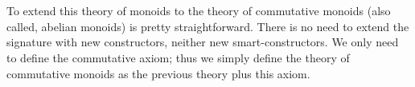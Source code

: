 \begin{code}
\>[4]\AgdaSpace{}%
\AgdaSymbol{=}\AgdaSpace{}%
\AgdaSpace{}%
\AgdaSymbol{(}\AgdaSpace{}%
\AgdaSpace{}%
\AgdaSymbol{)}\AgdaSpace{}%
\AgdaSpace{}%
\AgdaSpace{}%
\AgdaSpace{}%
\AgdaSymbol{(}\AgdaSpace{}%
\AgdaSpace{}%
\AgdaSymbol{(}\AgdaSpace{}%
\AgdaSpace{}%
\AgdaSymbol{))}\<%
\\
%
\\[\AgdaEmptyExtraSkip]%
%
\>[4]\AgdaSpace{}%
\AgdaSymbol{=}\AgdaSpace{}%
\AgdaSpace{}%
\AgdaSpace{}%
\AgdaSpace{}%
\AgdaSpace{}%
\AgdaSpace{}%
\<%
\\
%
\\[\AgdaEmptyExtraSkip]%
%
\>[4]\AgdaSpace{}%
\AgdaSymbol{=}\AgdaSpace{}%
\AgdaSpace{}%
\AgdaSpace{}%
\AgdaSpace{}%
\AgdaSpace{}%
\AgdaSpace{}%
\<%
\\
%
\\[\AgdaEmptyExtraSkip]%
%
\>[4]%
\>[15]\AgdaSymbol{:}\AgdaSpace{}%
\AgdaSpace{}%
\AgdaSpace{}%
\AgdaSymbol{(}\AgdaSpace{}%
\AgdaSpace{}%
\AgdaSpace{}%
\AgdaSpace{}%
\AgdaOperator{\AgdaFunction{[}}\AgdaSpace{}%
\AgdaSpace{}%
\AgdaOperator{\AgdaFunction{]}}\AgdaSymbol{)}\<%
\\
%
\>[4]\AgdaSpace{}%
\AgdaSymbol{=}\AgdaSpace{}%
\AgdaSpace{}%
\AgdaSpace{}%
\AgdaSymbol{(}\AgdaSpace{}%
\AgdaSpace{}%
\AgdaSpace{}%
\AgdaSpace{}%
\AgdaSymbol{)}\<%
\end{code}

\noindent
To extend this theory of monoids to the theory of commutative monoids (also
called, abelian monoids) is pretty straightforward. There is no need to extend
the signature with new constructors, neither new smart-constructors. We only
need to define the commutative axiom; thus we simply define the theory of
commutative monoids as the previous theory plus this axiom.

